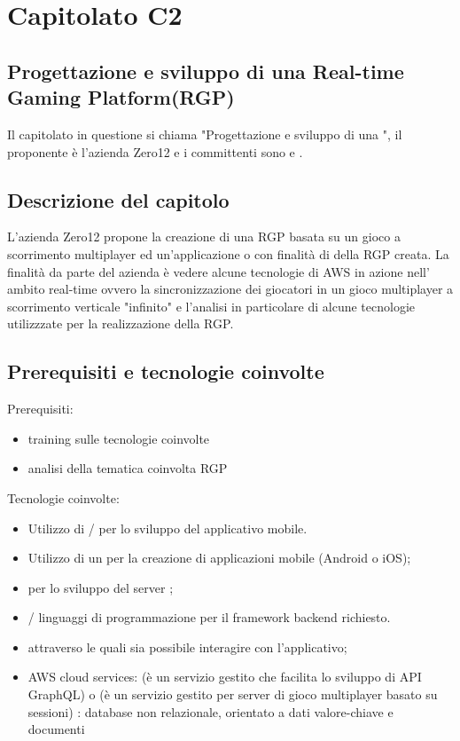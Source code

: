 \section{Capitolato C2}
\subsection{Progettazione e sviluppo di una Real-time Gaming Platform(RGP)}
Il capitolato in questione si chiama "Progettazione e sviluppo di una ", il proponente è l'azienda Zero12 e i committenti sono \VT{} e \CR{}.

\subsection{Descrizione del capitolo}
L’azienda Zero12 propone la creazione di una RGP basata su un gioco a scorrimento multiplayer ed un'applicazione  o  con finalità di  della RGP creata.
La finalità da parte del azienda è vedere alcune tecnologie di AWS in azione nell' ambito real-time ovvero la sincronizzazione dei giocatori in un gioco multiplayer a scorrimento verticale "infinito" e l'analisi in particolare di alcune tecnologie utilizzzate per la realizzazione della RGP.
\subsection{Prerequisiti e tecnologie coinvolte}
Prerequisiti:
\begin{itemize}
\item training sulle tecnologie coinvolte
\item analisi della tematica coinvolta RGP 
\end{itemize}
Tecnologie coinvolte:
\begin{itemize}
\item Utilizzo di / per lo sviluppo del applicativo mobile.
\item Utilizzo di un  per la creazione di applicazioni mobile (Android o iOS);
\item {} per lo sviluppo del server ;
\item {}/ linguaggi di programmazione per il framework backend richiesto.
\item {}  attraverso le quali sia possibile interagire con l'applicativo;
\item AWS cloud services: 
(è un servizio gestito che facilita lo sviluppo di API GraphQL) o (è un servizio gestito per server di gioco multiplayer basato su sessioni) 
: database non relazionale, orientato a dati valore-chiave e documenti
\end{itemize}

